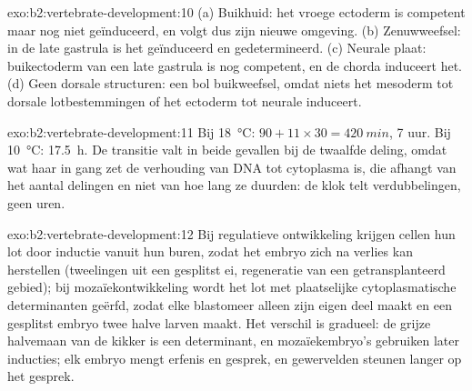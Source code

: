 \begin{solution}{exo:b2:vertebrate-development:10}
(a) Buikhuid: het vroege ectoderm is competent maar nog niet geïnduceerd,
en volgt dus zijn nieuwe omgeving. (b) Zenuwweefsel: in de late gastrula is
het geïnduceerd en gedetermineerd. (c) Neurale plaat: buikectoderm van een
late gastrula is nog competent, en de chorda induceert het. (d) Geen
dorsale structuren: een bol buikweefsel, omdat niets het mesoderm tot
dorsale lotbestemmingen of het ectoderm tot neurale induceert.
\end{solution}

\begin{solution}{exo:b2:vertebrate-development:11}
Bij \qty{18}{\celsius}: $90 + 11\times 30 = \qty{420}{min}$, 7 uur.
Bij \qty{10}{\celsius}: \qty{17.5}{h}. De transitie valt in beide gevallen
bij de twaalfde deling, omdat wat haar in gang zet de verhouding van DNA
tot cytoplasma is, die afhangt van het aantal delingen en niet van hoe lang
ze duurden: de klok telt verdubbelingen, geen uren.
\end{solution}

\begin{solution}{exo:b2:vertebrate-development:12}
Bij regulatieve ontwikkeling krijgen cellen hun lot door inductie vanuit
hun buren, zodat het embryo zich na verlies kan herstellen (tweelingen uit
een gesplitst ei, regeneratie van een getransplanteerd gebied); bij
mozaïekontwikkeling wordt het lot met plaatselijke cytoplasmatische
determinanten geërfd, zodat elke blastomeer alleen zijn eigen deel maakt en
een gesplitst embryo twee halve larven maakt. Het verschil is gradueel: de
grijze halvemaan van de kikker is een determinant, en mozaïekembryo's
gebruiken later inducties; elk embryo mengt erfenis en gesprek, en
gewervelden steunen langer op het gesprek.
\end{solution}

